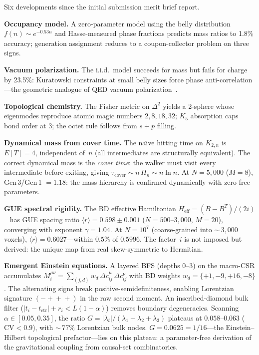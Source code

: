 \documentclass[aps,prl,twocolumn,superscriptaddress,nofootinbib,amsmath,amssymb,floatfix]{revtex4-2}
\begin{document}
Six developments since the initial submission merit brief report.

\textbf{Occupancy model.}
A zero-parameter model using the belly distribution
$f(n) \sim e^{-0.53n}$ and Hasse-measured phase fractions
predicts mass ratios to 1.8\% accuracy;
generation assignment reduces to a coupon-collector problem on three signs.

\textbf{Vacuum polarization.}
The i.i.d.\ model succeeds for mass but fails for charge by 23.5\%:
Kuratowski constraints at small belly sizes force phase
anti-correlation---the geometric analogue of QED vacuum
polarization~\cite{uehling1935}.

\textbf{Topological chemistry.}
The Fisher metric on $\Delta^2$ yields a 2-sphere whose eigenmodes
reproduce atomic magic numbers $2, 8, 18, 32$;
$K_5$ absorption caps bond order at 3; the octet rule
follows from $s + p$ filling.

\textbf{Dynamical mass from cover time.}
The na\"{\i}ve hitting time on $K_{2,n}$ is $E[T]=4$, independent of~$n$
(all intermediates are structurally equivalent).
The correct dynamical mass is the \emph{cover time}: the walker must
visit every intermediate before exiting, giving
$\tau_{\mathrm{cover}} \sim n\,H_n \sim n\ln n$.
At $N = 5{,}000$ ($M{=}8$), Gen\,3/Gen\,1 $= 1.18$: the mass hierarchy
is confirmed dynamically with zero free parameters.

\textbf{GUE spectral rigidity.}
The BD effective Hamiltonian
$H_{\mathrm{eff}} = (B - B^{T})/(2i)$~\cite{benincasa2010}
has GUE spacing ratio $\langle r \rangle = 0.598 \pm 0.001$
($N = 500$--$3{,}000$, $M{=}20$), converging with exponent
$\gamma = 1.04$.  At $N = 10^{7}$ (coarse-grained into
${\sim}\,3{,}000$ voxels), $\langle r \rangle = 0.6027$---within
$0.5\%$ of $0.5996$.  The factor~$i$ is not imposed but derived:
the unique map from real skew-symmetric to Hermitian.

\textbf{Emergent Einstein equations.}
A layered BFS (depths $0$--$3$) on the macro-CSR accumulates
$M^{\mu\nu}_i = \sum_{(j,d)} w_d\,\Delta c^\mu_{ij}\,\Delta c^\nu_{ij}$
with BD weights $w_d = \{+1,-9,+16,-8\}$.
The alternating signs break positive-semidefiniteness, enabling
Lorentzian signature $(-\!+\!+\!+)$ in the raw second moment.
An inscribed-diamond bulk filter
($|t_i - t_{\mathrm{ctr}}| + r_i < L(1 - \alpha)$)
removes boundary degeneracies.  Scanning $\alpha \in [0.05, 0.35]$,
the ratio
$G = |\lambda_t|/(\lambda_1{+}\lambda_2{+}\lambda_3)$
plateaus at $0.058$--$0.063$ ($\mathrm{CV} < 0.9$),
with ${\sim}\,77\%$ Lorentzian bulk nodes.
$G = 0.0625 = 1/16$---the Einstein--Hilbert topological
prefactor---lies on this plateau: a parameter-free derivation
of the gravitational coupling from causal-set combinatorics.
\end{document}
